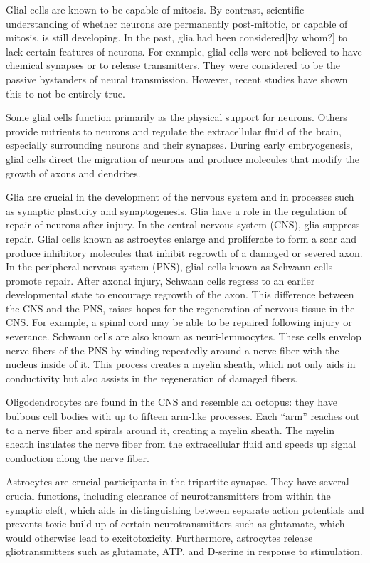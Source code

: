 Glial cells are known to be capable of mitosis. By contrast, scientific understanding of whether neurons are permanently post-mitotic, or capable of mitosis, is still developing. In the past, glia had been considered{[}by whom?{]} to lack certain features of neurons. For example, glial cells were not believed to have chemical synapses or to release transmitters. They were considered to be the passive bystanders of neural transmission. However, recent studies have shown this to not be entirely true.

Some glial cells function primarily as the physical support for neurons. Others provide nutrients to neurons and regulate the extracellular fluid of the brain, especially surrounding neurons and their synapses. During early embryogenesis, glial cells direct the migration of neurons and produce molecules that modify the growth of axons and dendrites.

Glia are crucial in the development of the nervous system and in processes such as synaptic plasticity and synaptogenesis. Glia have a role in the regulation of repair of neurons after injury. In the central nervous system (CNS), glia suppress repair. Glial cells known as astrocytes enlarge and proliferate to form a scar and produce inhibitory molecules that inhibit regrowth of a damaged or severed axon. In the peripheral nervous system (PNS), glial cells known as Schwann cells promote repair. After axonal injury, Schwann cells regress to an earlier developmental state to encourage regrowth of the axon. This difference between the CNS and the PNS, raises hopes for the regeneration of nervous tissue in the CNS. For example, a spinal cord may be able to be repaired following injury or severance. Schwann cells are also known as neuri-lemmocytes. These cells envelop nerve fibers of the PNS by winding repeatedly around a nerve fiber with the nucleus inside of it. This process creates a myelin sheath, which not only aids in conductivity but also assists in the regeneration of damaged fibers.

Oligodendrocytes are found in the CNS and resemble an octopus: they have bulbous cell bodies with up to fifteen arm-like processes. Each ``arm'' reaches out to a nerve fiber and spirals around it, creating a myelin sheath. The myelin sheath insulates the nerve fiber from the extracellular fluid and speeds up signal conduction along the nerve fiber.

Astrocytes are crucial participants in the tripartite synapse. They have several crucial functions, including clearance of neurotransmitters from within the synaptic cleft, which aids in distinguishing between separate action potentials and prevents toxic build-up of certain neurotransmitters such as glutamate, which would otherwise lead to excitotoxicity. Furthermore, astrocytes release gliotransmitters such as glutamate, ATP, and D-serine in response to stimulation.

